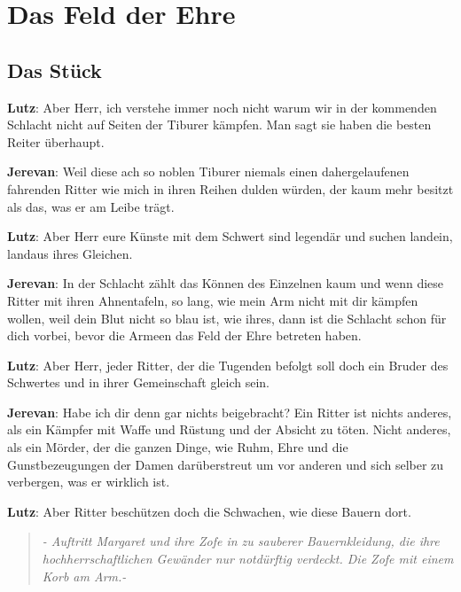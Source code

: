 \documentclass[a5paper,7pt, twocolumn]{book}
\begin{document}
\setlength{\columnseprule}{0,1mm}



\chapter{Das Feld der Ehre}


\pagebreak
\newpage

\section{Das Stück}


\textbf{Lutz}: Aber Herr, ich verstehe immer noch nicht warum wir in der kommenden Schlacht nicht auf Seiten der Tiburer kämpfen. Man sagt sie haben die besten Reiter überhaupt.

\textbf{Jerevan}: Weil diese ach so noblen Tiburer niemals einen dahergelaufenen fahrenden Ritter wie mich in ihren Reihen dulden würden, der kaum mehr besitzt als das, was er am Leibe trägt.

\textbf{Lutz}: Aber Herr eure Künste mit dem Schwert sind legendär und suchen landein, landaus ihres Gleichen.

\textbf{Jerevan}: In der Schlacht zählt das Können des Einzelnen kaum und wenn diese Ritter mit ihren Ahnentafeln, so lang, wie mein Arm nicht mit dir kämpfen wollen, weil dein Blut nicht so blau ist, wie ihres, dann ist die Schlacht schon für dich vorbei, bevor die Armeen das Feld der Ehre betreten haben.

\textbf{Lutz}: Aber Herr, jeder Ritter, der die Tugenden befolgt soll doch ein Bruder des Schwertes und in ihrer Gemeinschaft gleich sein.

\textbf{Jerevan}: Habe ich dir denn gar nichts beigebracht? Ein Ritter ist nichts anderes, als ein Kämpfer mit Waffe und Rüstung und der Absicht zu töten. Nicht anderes, als ein Mörder, der die ganzen Dinge, wie Ruhm, Ehre und die Gunstbezeugungen der Damen darüberstreut um vor anderen und sich selber zu verbergen, was er wirklich ist.

\textbf{Lutz}: Aber Ritter beschützen doch die Schwachen, wie diese Bauern dort.

\begin{quote}
  \textit{- Auftritt Margaret und ihre Zofe in zu sauberer Bauernkleidung, die ihre hochherrschaftlichen Gewänder nur notdürftig verdeckt. Die Zofe mit einem Korb am Arm.-
}
 \end{quote}
\end{document}
